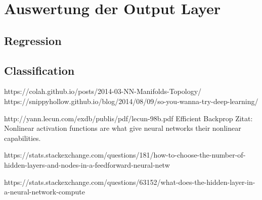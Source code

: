 \section{Auswertung der Output Layer}

\subsection{Regression}

\subsection{Classification}

https://colah.github.io/posts/2014-03-NN-Manifolds-Topology/
https://snippyhollow.github.io/blog/2014/08/09/so-you-wanna-try-deep-learning/

http://yann.lecun.com/exdb/publis/pdf/lecun-98b.pdf Efficient Backprop
Zitat: Nonlinear activation functions are what give neural networks their nonlinear capabilities. 

https://stats.stackexchange.com/questions/181/how-to-choose-the-number-of-hidden-layers-and-nodes-in-a-feedforward-neural-netw

https://stats.stackexchange.com/questions/63152/what-does-the-hidden-layer-in-a-neural-network-compute
